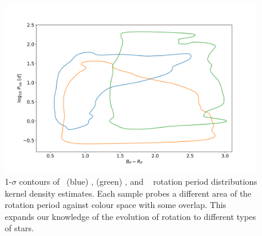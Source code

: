 \begin{figure}[h]
    \includegraphics[width=\textwidth]{Figures/intro_figures/rot_comp.png}
    \caption[1-$\sigma$ contours of \kepler\ (blue), \ZTF\ (green), and \GDRT\ (orange) rotation period distributions kernel density estimates.]{1-$\sigma$ contours of \kepler\ (blue) \citep{mcquillan_rotation_2014}, \ZTF (green) \citep{lu_bridging_2022}, and \GDRT\ \citep{distefano_gaia_2022} rotation period distributions kernel density estimates. Each sample probes a different area of the rotation period against colour space with some overlap. This expands our knowledge of the evolution of rotation to different types of stars. }
    \label{fig:rot_comp}
\end{figure}

